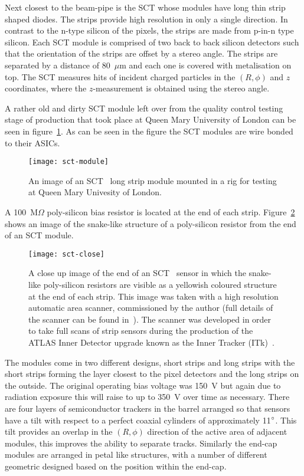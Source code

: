 Next closest to the beam-pipe is the SCT whose modules have long thin strip
shaped diodes. The strips provide high resolution in only a single direction. In
contrast to the n-type silicon of the pixels, the strips are made from p-in-n
type silicon. Each SCT module is comprised of two back to back silicon
detectors such that the orientation of the strips are offset by a stereo angle.
The strips are separated by a distance of 80~$\mu$m and each one is covered with
metalisation on top. The SCT measures hits of incident charged particles in the
$(R, \phi)$ and $z$ coordinates, where the $z$-measurement is obtained using the
stereo angle.

A rather old and dirty SCT module left over from the quality control testing
stage of production that took place at Queen Mary University of London can be
seen in figure~\ref{fig:strip-module}. As can be seen in the figure the SCT
modules are wire bonded to their ASICs.
\begin{figure}[ht]
  \centering
  \texttt{[image: sct-module]}
  \caption[ATLAS long strip module]{An image of an SCT~\cite{ATLAS-ID-TDR} long
    strip module mounted in a rig for testing at Queen Mary Univesity of
    London.}
  \label{fig:strip-module}
\end{figure}
A 100~M$\Omega$ poly-silicon bias resistor is located at the end of each strip.
Figure~\ref{fig:sct-close} shows an image of the snake-like structure of a
poly-silicon resistor from the end of an SCT module.
\begin{figure}[ht]
  \centering
  \texttt{[image: sct-close]}
  \caption[ATLAS strip close-up]{A close up image of the end of an
    SCT~\cite{ATLAS-ID-TDR} sensor in which the snake-like poly-silicon
    resistors are visible as a yellowish coloured structure at the end of each
    strip. This image was taken with a high resolution automatic area scanner,
    commissioned by the author (full details of the scanner can be found
    in~\cite{itk-scanner}). The scanner was developed in order to take full
    scans of strip sensors during the production of the ATLAS Inner Detector
    upgrade known as the Inner Tracker (ITk)~\cite{itk-tdr, itk-strips-tdr}.
  }
  
  \label{fig:sct-close}
\end{figure}
The modules come in two different designs, short strips and long
strips with the short strips forming the layer closest to the pixel detectors
and the long strips on the outside. The original operating bias voltage was
150~V but again due to radiation exposure this will raise to up to 350~V over
time as necessary. There are four layers of semiconductor trackers in the barrel
arranged so that sensors have a tilt with respect to a perfect coaxial cylinders
of approximately 11$\degree$. This tilt provides an overlap in the $(R, \phi)$
direction of the active area of adjacent modules, this improves the ability to
separate tracks. Similarly the end-cap modules are arranged in petal like
structures, with a number of different geometric designed based on the position
within the end-cap.

